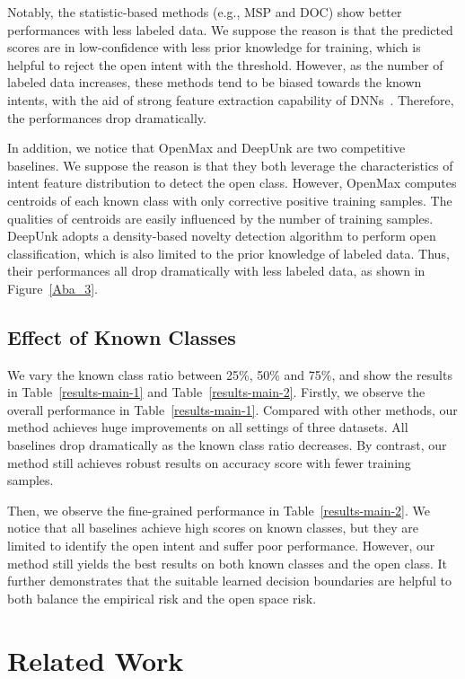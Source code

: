 \documentclass[letterpaper]{article} %
\begin{document}
	Notably, the statistic-based methods (e.g., MSP and DOC) show better performances with less labeled data. We suppose the reason is that the predicted scores are in low-confidence with less prior knowledge for training, which is helpful to reject the open intent with the threshold. However, as the number of labeled data increases, these methods tend to be biased towards the known intents, with the aid of strong feature extraction capability of DNNs~\cite{7298640}. Therefore, the performances drop dramatically. 
	

	In addition, we notice that OpenMax and DeepUnk are two competitive baselines. We suppose the reason is that they both leverage the characteristics of intent feature distribution to detect the open class. However, OpenMax computes centroids of each known class with only corrective positive training samples. The qualities of centroids are easily influenced by the number of training samples. DeepUnk adopts a density-based novelty detection algorithm to perform open classification, which is also limited to the prior knowledge of labeled data. Thus, their performances all drop dramatically with less labeled data, as shown in Figure~\ref{Aba_3}.
	
	
	\subsection{Effect of Known Classes}
	We vary the known class ratio between 25\%, 50\% and 75\%, and show the results in Table~\ref{results-main-1} and Table~\ref{results-main-2}. Firstly, we observe the overall performance in Table~\ref{results-main-1}. Compared with other methods, our method achieves huge improvements on all settings of three datasets. All baselines drop dramatically as the known class ratio decreases. By contrast, our method still achieves robust results on accuracy score with fewer training samples. 
	
	Then, we observe the fine-grained performance in Table~\ref{results-main-2}. We notice that all baselines achieve high scores on known classes, but they are limited to identify the open intent and suffer poor performance. However, our method still yields the best results on both known classes and the open class. It further demonstrates that the suitable learned decision boundaries are helpful to both balance the empirical risk and the open space risk.
	
	\section{Related Work}
\end{document}
